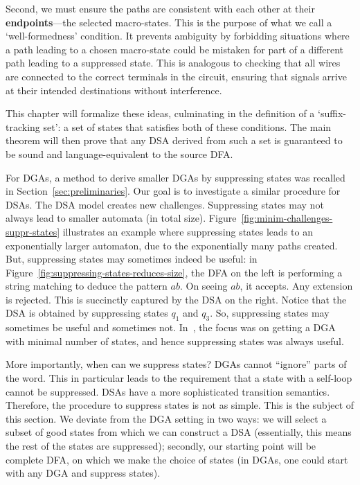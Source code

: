Second, we must ensure the paths are consistent with each other at their \textbf{endpoints}—the selected macro-states. This is the purpose of what we call a `well-formedness' condition. It prevents ambiguity by forbidding situations where a path leading to a chosen macro-state could be mistaken for part of a different path leading to a suppressed state. This is analogous to checking that all wires are connected to the correct terminals in the circuit, ensuring that signals arrive at their intended destinations without interference.

This chapter will formalize these ideas, culminating in the definition of a `suffix-tracking set': a set of states that satisfies both of these conditions. The main theorem will then prove that any DSA derived from such a set is guaranteed to be sound and language-equivalent to the source DFA.

\vspace{0.25cm}

For DGAs, a
method to derive smaller DGAs by suppressing states was 
recalled in Section~\ref{sec:preliminaries}. Our goal is to
investigate a similar procedure for DSAs. The DSA model creates
new challenges. Suppressing states may not always lead to
smaller automata (in total
size). Figure~\ref{fig:minim-challenges-suppr-states} illustrates an
example where suppressing states leads to an exponentially larger
automaton, due to the exponentially many
paths created. But, suppressing states may sometimes
indeed be useful: in Figure~\ref{fig:suppressing-states-reduces-size},
the DFA on the left is performing a string matching to deduce the
pattern $ab$. On seeing $ab$, it accepts. Any extension is
rejected. This is succinctly captured by the DSA on the right. Notice
that the DSA is obtained by suppressing states $q_1$ and $q_3$. So,
suppressing states may sometimes be useful and sometimes not. In~\cite{giammarresi1999deterministic}, the focus was on
getting a DGA with minimal number of states, and hence suppressing
states was always useful.

More importantly, when can we suppress states? DGAs cannot ``ignore''
parts of the word. This in particular leads to the requirement that a
state with a self-loop cannot be suppressed. DSAs have a more
sophisticated transition semantics. Therefore, the procedure to
suppress states is not as simple. This is the subject of this
section. We deviate from the DGA setting in two ways:  we will select a subset of good states from which we can
construct a DSA (essentially, this means the rest of the states are
suppressed); secondly, our starting point will be complete DFA, on
which we make the choice of states (in DGAs, one could start
with any DGA and suppress states). 

